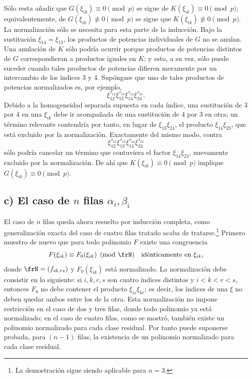 \documentclass[11pt]{article}
\begin{document}
Sólo resta añadir que \(G(\xi_{ik})\equiv0\pmod p\) se sigue de \(K(\xi_{ik})\equiv0\pmod p\); equivalentemente, de \(G(\xi_{ik})\not\equiv0\pmod p\) se sigue que \(K(\xi_{ik})\not\equiv0\pmod p\). La normalización sólo se necesita para esta parte de la inducción. Bajo la sustitución \(\xi_{14}=\xi_{13}\), los productos de potencias individuales de \(G\) no se anulan. Una anulación de \(K\) sólo podría ocurrir porque productos de potencias distintos de \(G\) correspondieran a productos iguales en \(K\); y esto, a su vez, sólo puede suceder cuando tales productos de potencias difieren meramente por un intercambio de los índices 3 y 4. Supóngase que uno de tales productos de potencias normalizados es, por ejemplo,
\[
        \xi_{12}^{\tau_{12}}\xi_{13}^{\tau_{13}}\xi_{14}^{\tau_{14}}\xi_{24}^{\tau_{24}}.
\]
Debido a la homogeneidad separada supuesta en cada índice, una sustitución de 3 por 4 en una \(\xi_{ik}\) debe ir acompañada de una sustitución de 4 por 3 en otra; un término relevante contendría por tanto, en lugar de \(\xi_{13}\xi_{24}\), el producto \(\xi_{14}\xi_{23}\), que está excluido por la normalización. Exactamente del mismo modo, contra
\[
        \xi_{12}^{\tau_{12}}\xi_{13}^{\tau_{13}}\xi_{14}^{\tau_{14}}\xi_{24}^{\tau_{24}}
\]
sólo podría cancelar un término que contuviera el factor \(\xi_{14}\xi_{23}\), nuevamente excluido por la normalización. De ahí que \(K(\xi_{ik})\equiv0\pmod p\) implique \(G(\xi_{ik})\equiv0\pmod p\).

\subsection*{c) El caso de \(n\) filas \(\alpha_i,\beta_i\)}

El caso de \(n\) filas queda ahora resuelto por inducción completa, como generalización exacta del caso de cuatro filas tratado acaba de tratarse.\footnote{La demostración sigue siendo aplicable para \(n=3\).}
Primero muestro de nuevo que para todo polinomio \(F\) existe una congruencia
\begin{equation}
        F(\xi_{ik})\equiv F_0(\xi_{ik})\pmod{\frN}
        \quad \text{idénticamente en \(\xi_{ik}\)},
\end{equation}
donde \(\frN=(f_{ik,rs})\) y \(F_0(\xi_{ik})\) está normalizado. La normalización debe consistir en lo siguiente: si \(i,k,r,s\) son cuatro índices distintos y \(i<k<r<s\), entonces \(F_0\) no debe contener el producto \(\xi_{is}\xi_{kr}\); es decir, los índices de una \(\xi\) no deben quedar ambos entre los de la otra. Esta normalización no impone restricción en el caso de dos y tres filas, donde todo polinomio ya está normalizado; en el caso de cuatro filas, como se mostró, también existe un polinomio normalizado para cada clase residual. Por tanto puede suponerse probada, para \((n-1)\) filas, la existencia de un polinomio normalizado para cada clase residual.
\end{document}

